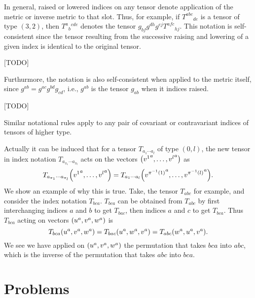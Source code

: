 \documentclass{note}
\numberwithin{equation}{chapter}
\begin{document}
\begin{quotebox}
  In general, raised or lowered indices on any tensor denote application of the
  metric or inverse metric to that slot. Thus, for example, if $T^{abc}{}_{de}$ is a
  tensor of type $(3,2)$, then $T^a{}_b{}^{cde}$ denotes the tensor
  $g_{bf}g^{dh}g^{ej}T^{afc}{}_{hj}$. This notation is self-consistent since the
  tensor resulting from the successive raising and lowering of a given index is
  identical to the original tensor.
\end{quotebox}

[TODO]

\begin{quotebox}
  Furthurmore, the notation is also self-consistent when applied to the metric
  itself, since $g^{ab} = g^{ac}g^{bd}g_{cd}$, i.e., $g^{ab}$ is the tensor $g_{ab}$
  when it indices raised.
\end{quotebox}

[TODO]

\begin{quotebox}
  Similar notational rules apply to any pair of covariant or contravariant indices
  of tensors of higher type.
\end{quotebox}

Actually it can be induced that for a tensor $T_{a_1\cdots a_l}$ of type $(0, l)$,
the new tensor in index notation $T_{a_{\pi_1}\cdots a_{\pi_l}}$ acts on the vectors
$\prn{{v^1}^a, \dots, {v^l}^a}$ as
\begin{equation*}
  T_{a_{\pi_1}\cdots a_{\pi_l}} \prn{{v^1}^a, \dots, {v^l}^a} = T_{a_1\cdots a_l}
  \prn{{v^{\pi^{-1}(1)}}^a, \dots, {v^{\pi^{-1}(l)}}^a}.
\end{equation*}
We show an example of why this is true. Take, the tensor $T_{abc}$ for example, and
consider the index notation $T_{bca}$. $T_{bca}$ can be obtained from $T_{abc}$ by
first interchanging indices $a$ and $b$ to get $T_{bac}$, then indices $a$ and $c$
to get $T_{bca}$. Thus $T_{bca}$ acting on vectors $\prn{u^a, v^a, w^a}$ is
\begin{equation*}
  T_{bca} \prn{u^a, v^a, w^a} = T_{bac} \prn{u^a, w^a, v^a} = T_{abc} \prn{w^a, u^a,
  v^a}.
\end{equation*}
We see we have applied on $\prn{u^a, v^a, w^a}$ the permutation that takes $bca$
into $abc$, which is the inverse of the permutation that takes $abc$ into $bca$.

\section*{Problems}
\end{document}
